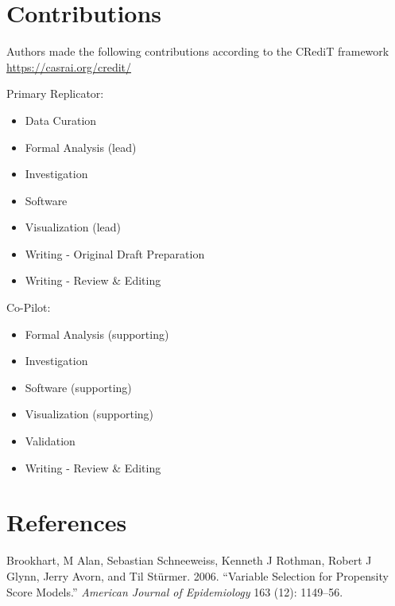 \documentclass[10,a4paperpaper,]{article}
\begin{document}
\section{Contributions}

Authors made the following contributions according to the CRediT
framework \url{https://casrai.org/credit/}

Primary Replicator:

\begin{itemize}
\tightlist
\item
  Data Curation\\
\item
  Formal Analysis (lead)\\
\item
  Investigation\\
\item
  Software\\
\item
  Visualization (lead)\\
\item
  Writing - Original Draft Preparation\\
\item
  Writing - Review \& Editing
\end{itemize}

Co-Pilot:

\begin{itemize}
\tightlist
\item
  Formal Analysis (supporting)\\
\item
  Investigation\\
\item
  Software (supporting)\\
\item
  Visualization (supporting)\\
\item
  Validation\\
\item
  Writing - Review \& Editing
\end{itemize}

\newpage

\section*{References}
\begingroup
\hphantom{x}
\setlength{\parindent}{-0.5in}
\setlength{\leftskip}{0.5in}

\hypertarget{refs}{}
\leavevmode\hypertarget{ref-brookhart2006variable}{}%
Brookhart, M Alan, Sebastian Schneeweiss, Kenneth J Rothman, Robert J
Glynn, Jerry Avorn, and Til Stürmer. 2006. ``Variable Selection for
Propensity Score Models.'' \emph{American Journal of Epidemiology} 163
(12): 1149--56.
\end{document}

